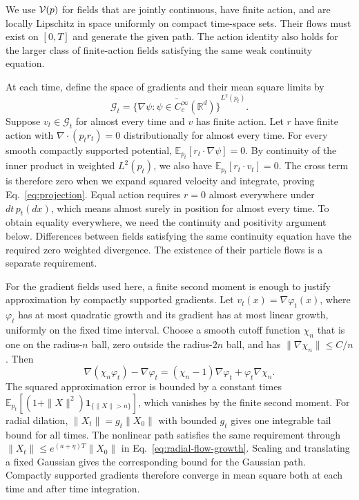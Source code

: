We use $\mathcal V(p)$ for fields that are jointly continuous, have finite action, and are locally Lipschitz in space uniformly on compact time-space sets. Their flows must exist on $[0,T]$ and generate the given path. The action identity also holds for the larger class of finite-action fields satisfying the same weak continuity equation.

At each time, define the space of gradients and their mean square limits by
\[
 \mathcal G_t=\overline{\{\nabla\psi:\psi\in C_c^\infty(\mathbb R^d)\}}
 ^{L^2(p_t)}.
\]
Suppose $v_t\in\mathcal G_t$ for almost every time and $v$ has finite action. Let $r$ have finite action with $\nabla\!\cdot(p_tr_t)=0$ distributionally for almost every time. For every smooth compactly supported potential, $\mathbb E_{p_t}[r_t\cdot\nabla\psi]=0$. By continuity of the inner product in weighted $L^2(p_t)$, we also have $\mathbb E_{p_t}[r_t\cdot v_t]=0$. The cross term is therefore zero when we expand squared velocity and integrate, proving Eq.~\eqref{eq:projection}. Equal action requires $r=0$ almost everywhere under $dt\,p_t(dx)$, which means almost surely in position for almost every time. To obtain equality everywhere, we need the continuity and positivity argument below. Differences between fields satisfying the same continuity equation have the required zero weighted divergence. The existence of their particle flows is a separate requirement.

For the gradient fields used here, a finite second moment is enough to justify approximation by compactly supported gradients. Let $v_t(x)=\nabla\varphi_t(x)$, where
$\varphi_t$ has at most quadratic growth and its gradient has at most
linear growth, uniformly on the fixed time interval. Choose a smooth cutoff function
$\chi_n$ that is one on the radius-$n$ ball, zero outside the radius-$2n$
ball, and has $\|\nabla\chi_n\|\le C/n$. Then
\[
 \nabla(\chi_n\varphi_t)-\nabla\varphi_t
 =(\chi_n-1)\nabla\varphi_t+\varphi_t\nabla\chi_n.
\]
The squared approximation error is bounded by a constant times $\mathbb E_{p_t}[(1+\|X\|^2)\mathbf1_{\{\|X\|>n\}}]$, which vanishes by the finite second moment. For radial dilation, $\|X_t\|=g_t\|X_0\|$ with bounded $g_t$ gives one integrable tail bound for all times. The nonlinear path satisfies the same requirement through $\|X_t\|\le e^{(a+\eta)T}\|X_0\|$ in Eq.~\eqref{eq:radial-flow-growth}. Scaling and translating a fixed Gaussian gives the corresponding bound for the Gaussian path. Compactly supported gradients therefore converge in mean square both at each time and after time integration.

